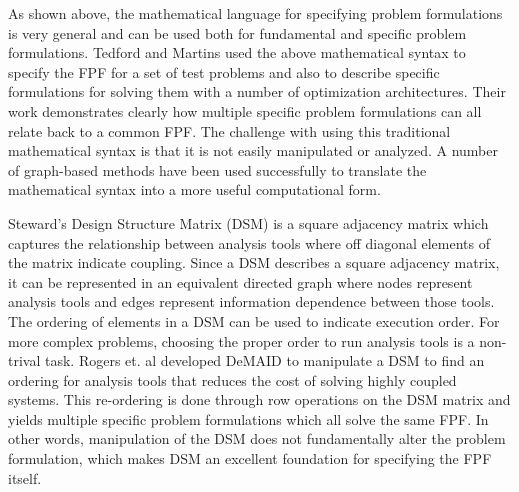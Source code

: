     As shown above, the mathematical language for specifying problem formulations is very general and can be used both for 
    fundamental and specific problem formulations. Tedford and Martins used the above mathematical syntax to specify the 
    FPF for a set of test problems and also to describe specific formulations for solving them with a 
    number of optimization architectures\cite{Tedford2009}. Their work demonstrates clearly how multiple specific 
    problem formulations can all relate back to a common FPF. The challenge with using this 
    traditional mathematical syntax is that it is not easily manipulated or analyzed. 
    A number of graph-based methods have been used successfully to translate the 
    mathematical syntax into a more useful computational form. 
    
    Steward's Design Structure Matrix (DSM) is a square adjacency matrix which captures the relationship between analysis tools where off 
    diagonal elements of the matrix indicate coupling\cite{Steward1981}. Since a DSM describes a square adjacency matrix, 
    it can be represented in an equivalent directed graph where nodes represent analysis tools and 
    edges represent information dependence between those tools. The ordering of elements in a DSM can be used to indicate 
    execution order.  For more complex problems, choosing the proper order to run analysis tools is a non-trival task. 
    Rogers et. al developed DeMAID to manipulate a DSM to find an ordering for analysis tools that 
    reduces the cost of solving highly coupled systems\cite{Rogers1996}. This re-ordering is done through 
    row operations on the DSM matrix and yields multiple specific problem 
    formulations which all solve the same FPF. In other words, manipulation of the DSM does not fundamentally alter
    the problem formulation, which makes DSM an excellent foundation for specifying the FPF itself. 
    
